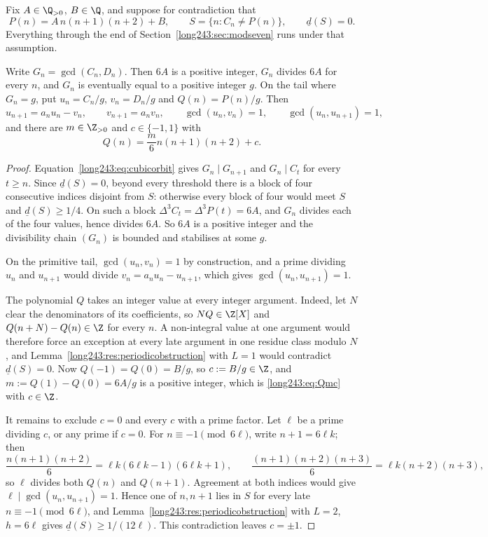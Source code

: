 \documentclass[11pt]{article}
\begin{document}
Fix $A\in\Q_{>0}$, $B\in\Q$, and suppose for contradiction that
\[
 P(n)=A\,n(n+1)(n+2)+B,
 \qquad S=\{n:C_n\ne P(n)\},
 \qquad \underline d(S)=0 .
\]
Everything through the end of Section~\ref{long243:sec:modseven} runs under that
assumption.

\begin{lemma}\label{long243:res:gcdshape}
Write $G_n=\gcd(C_n,D_n)$.  Then $6A$ is a positive integer, $G_n$ divides
$6A$ for every $n$, and $G_n$ is eventually equal to a positive integer
$g$.  On the tail where $G_n=g$, put $u_n=C_n/g$, $v_n=D_n/g$ and
$Q(n)=P(n)/g$.  Then
\begin{equation}\label{long243:eq:primitivetail}
 u_{n+1}=a_nu_n-v_n,\qquad v_{n+1}=a_nv_n,\qquad \gcd(u_n,v_n)=1,
 \qquad\gcd(u_n,u_{n+1})=1,
\end{equation}
and there are $m\in\Z_{>0}$ and $c\in\{-1,1\}$ with
\begin{equation}\label{long243:eq:Qmc}
 Q(n)=\frac m6n(n+1)(n+2)+c .
\end{equation}
\end{lemma}

\begin{proof}
Equation~\eqref{long243:eq:cubicorbit} gives $G_n\mid G_{n+1}$ and $G_n\mid C_t$ for
every $t\ge n$.  Since $\underline d(S)=0$, beyond every threshold there is a block of four
consecutive indices disjoint from $S$: otherwise every block of four would meet
$S$ and $\underline d(S)\ge1/4$.  On such a block $\Delta^3C_t=\Delta^3P(t)=6A$, and
$G_n$ divides each of the four values, hence divides $6A$.  So $6A$
is a positive integer and the divisibility chain $(G_n)$ is bounded and
stabilises at some $g$.

On the primitive tail, $\gcd(u_n,v_n)=1$ by construction, and a prime dividing
$u_n$ and $u_{n+1}$ would divide $v_n=a_nu_n-u_{n+1}$, which gives
$\gcd(u_n,u_{n+1})=1$.

The polynomial $Q$ takes an integer value at every integer argument.  Indeed,
let $N$ clear the denominators of its coefficients, so $NQ\in\Z[X]$ and
$Q(n+N)-Q(n)\in\Z$ for every $n$.  A non-integral value at one argument would
therefore force an exception at every late argument in one residue class modulo
$N$, and Lemma~\ref{long243:res:periodicobstruction} with $L=1$ would contradict
$\underline d(S)=0$.  Now $Q(-1)=Q(0)=B/g$, so $c:=B/g\in\Z$, and
$m:=Q(1)-Q(0)=6A/g$ is a positive integer, which is \eqref{long243:eq:Qmc} with
$c\in\Z$.

It remains to exclude $c=0$ and every $c$ with a prime factor.  Let $\ell$ be a
prime dividing $c$, or any prime if $c=0$.  For $n\equiv-1\pmod{6\ell}$, write
$n+1=6\ell k$; then
\[
 \frac{n(n+1)(n+2)}6=\ell k(6\ell k-1)(6\ell k+1),
 \qquad
 \frac{(n+1)(n+2)(n+3)}6=\ell k(n+2)(n+3),
\]
so $\ell$ divides both $Q(n)$ and $Q(n+1)$.  Agreement at both indices would
give $\ell\mid\gcd(u_n,u_{n+1})=1$.  Hence one of $n,n+1$ lies in $S$ for every
late $n\equiv-1\pmod{6\ell}$, and Lemma~\ref{long243:res:periodicobstruction} with
$L=2$, $h=6\ell$ gives $\underline d(S)\ge1/(12\ell)$.  This contradiction
leaves $c=\pm1$.
\end{proof}
\end{document}
